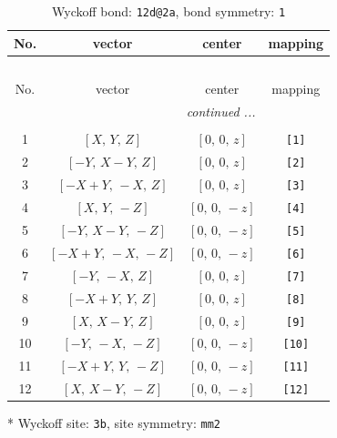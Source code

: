\documentclass[fleqn,8pt]{jsarticle}
\begin{document}
\begin{longtable}{cccc}
\caption{Wyckoff bond: {\tt 12d@2a}, bond symmetry: {\tt 1}}
 \\
 \hline \hline
No. & vector & center & mapping \\ \hline \endfirsthead

\multicolumn{3}{l}{\tablename\ \thetable{}} \\
 \hline \hline
No. & vector & center & mapping \\ \hline \endhead

 \hline \hline
\multicolumn{3}{r}{\footnotesize\it continued ...} \\ \endfoot

 \hline \hline
\multicolumn{3}{r}{} \\ \endlastfoot

1 & $\left[ X,\, Y,\, Z \right]$ & $\left[ 0,\, 0,\, z \right]$ & {\tt [1]} \\ \hline
2 & $\left[ - Y,\, X - Y,\, Z \right]$ & $\left[ 0,\, 0,\, z \right]$ & {\tt [2]} \\ \hline
3 & $\left[ - X + Y,\, - X,\, Z \right]$ & $\left[ 0,\, 0,\, z \right]$ & {\tt [3]} \\ \hline
4 & $\left[ X,\, Y,\, - Z \right]$ & $\left[ 0,\, 0,\, - z \right]$ & {\tt [4]} \\ \hline
5 & $\left[ - Y,\, X - Y,\, - Z \right]$ & $\left[ 0,\, 0,\, - z \right]$ & {\tt [5]} \\ \hline
6 & $\left[ - X + Y,\, - X,\, - Z \right]$ & $\left[ 0,\, 0,\, - z \right]$ & {\tt [6]} \\ \hline
7 & $\left[ - Y,\, - X,\, Z \right]$ & $\left[ 0,\, 0,\, z \right]$ & {\tt [7]} \\ \hline
8 & $\left[ - X + Y,\, Y,\, Z \right]$ & $\left[ 0,\, 0,\, z \right]$ & {\tt [8]} \\ \hline
9 & $\left[ X,\, X - Y,\, Z \right]$ & $\left[ 0,\, 0,\, z \right]$ & {\tt [9]} \\ \hline
10 & $\left[ - Y,\, - X,\, - Z \right]$ & $\left[ 0,\, 0,\, - z \right]$ & {\tt [10]} \\ \hline
11 & $\left[ - X + Y,\, Y,\, - Z \right]$ & $\left[ 0,\, 0,\, - z \right]$ & {\tt [11]} \\ \hline
12 & $\left[ X,\, X - Y,\, - Z \right]$ & $\left[ 0,\, 0,\, - z \right]$ & {\tt [12]} \\
\end{longtable}
* Wyckoff site: {\tt 3b}, site symmetry: {\tt mm2}
\renewcommand{\arraystretch}{1.2}
\end{document}

